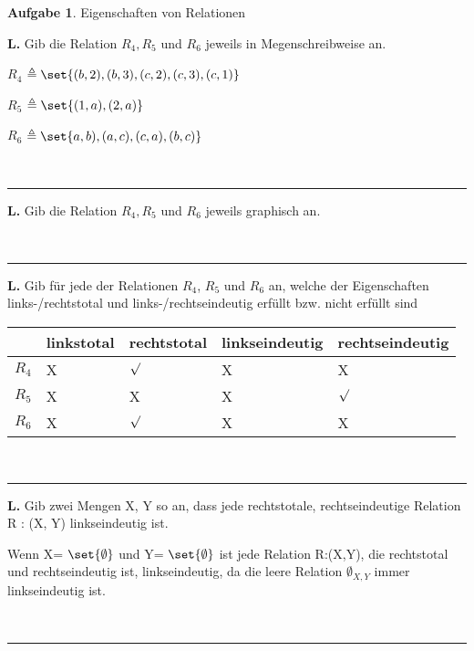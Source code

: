 \documentclass[10pt,leqno ]{article}
\DeclarePairedDelimiter\set\{\}
\theoremstyle{definition}
\newtheorem{problem}[theorem]{Aufgabe}
\newenvironment{solution}[1][L]{\begin{doublespace}\textbf{#1.}\quad }{\ \rule{0.5em}{0.5em}\end{doublespace}}
\begin{document}

\begin{problem}
    Eigenschaften von Relationen
\end{problem}

\begin{solution}
   Gib die Relation \(R_4, R_5\) und \(R_6\) jeweils in Megenschreibweise an.
   
   $R_4$ \( \triangleq \set \{ (b,2),(b,3),(c,2),(c,3),(c,1) \} \)
   
   $R_5$ \( \triangleq \set \{ (1,a),(2,a) \} \)
   
   $R_6$ \( \triangleq \set \{ a,b),(a,c),(c,a),(b,c) \} \)
   
   
\end{solution}
\begin{solution}
   Gib die Relation \(R_4, R_5\) und \(R_6\) jeweils graphisch an.
   
\end{solution}
\begin{solution}
   Gib für jede der Relationen \(R_4\), \(R_5\) und \(R_6\) an, welche der Eigenschaften links-/rechtstotal
   und links-/rechtseindeutig erfüllt bzw. nicht erfüllt sind
   
   \begin{tabular}{|p{1cm}|p{3cm}|p{3cm}|p{3cm}|p{3cm}|}
     \hline

        & linkstotal & rechtstotal& linkseindeutig& rechtseindeutig\\    
        
     \hline
       $R_4$  & X &  \(\surd \) & X & X  \\
     \hline
       $R_5$ & X  & X & X&  \(\surd \) \\
     \hline
       $R_6$ & X &  \(\surd \) & X & X \\
     \hline
   \end{tabular}
   
\end{solution}
\begin{solution}  
Gib zwei Mengen X, Y so an, dass jede rechtstotale, rechtseindeutige Relation R : (X, Y)
linkseindeutig ist.
   
   Wenn 
   X= \(\set {\emptyset} \)
   und Y= \(\set {\emptyset}\)
   ist jede Relation R:(X,Y), die rechtstotal und rechtseindeutig ist, linkseindeutig, da die leere Relation \(\emptyset_{X,Y}\) immer linkseindeutig ist.

   
\end{solution}
\end{document}
